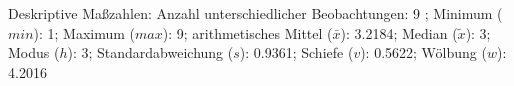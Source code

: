 				\vspace*{-\baselineskip}
                    \begin{noten}
                	    \note{} Deskriptive Maßzahlen:
                	    Anzahl unterschiedlicher Beobachtungen: 9%
                	    ; 
                	      Minimum ($min$): 1; 
                	      Maximum ($max$): 9; 
                	      arithmetisches Mittel ($\bar{x}$): \num[round-mode=places,round-precision=2]{3.2184}; 
                	      Median ($\tilde{x}$): 3; 
                	      Modus ($h$): 3; 
                	      Standardabweichung ($s$): \num[round-mode=places,round-precision=2]{0.9361}; 
                	      Schiefe ($v$): \num[round-mode=places,round-precision=2]{0.5622}; 
                	      Wölbung ($w$): \num[round-mode=places,round-precision=2]{4.2016}
                     \end{noten}


